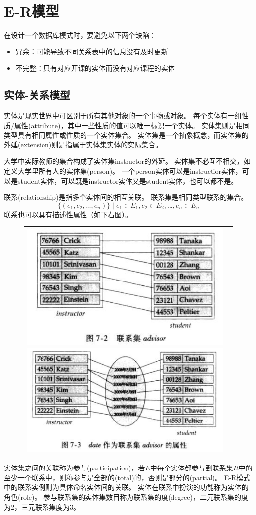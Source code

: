 
\section{E-R模型} %
在设计一个数据库模式时，要避免以下两个缺陷：
\begin{itemize}
	\item 冗余：可能导致不同关系表中的信息没有及时更新
	\item 不完整：只有对应开课的实体而没有对应课程的实体
\end{itemize}

\subsection{实体-关系模型}
\begin{definition}[实体]
实体是现实世界中可区别于所有其他对象的一个事物或对象。
每个实体有一组性质/属性(attribute)，其中一些性质的值可以唯一标识一个实体。
实体集则是相同类型具有相同属性或性质的一个实体集合。
实体集是一个抽象概念，而实体集的外延(extension)则是指属于实体集实体的实际集合。
\end{definition}

大学中实际教师的集合构成了实体集instructor的外延。
实体集不必互不相交，如定义大学里所有人的实体集(person)。
一个person实体可以是instructior实体，可以是student实体，可以既是instructor实体又是student实体，也可以都不是。

\begin{definition}[联系]
联系(relationship)是指多个实体间的相互关联。
联系集是相同类型联系的集合。
\[\{(e_1,e_2,\ldots,e_n)\}\mid e_1\in E_1, e_2\in E_2, \ldots, e_n\in E_n\]
联系也可以具有描述性属性（如下右图）。
\begin{figure}[H]
\centering
\begin{tabular}{cc}
\includegraphics[width=0.5\linewidth]{fig/relationship_set.png}
\includegraphics[width=0.5\linewidth]{fig/relationship_set(description).png}
\end{tabular}
\end{figure}
实体集之间的关联称为参与(participation)，若$E$中每个实体都参与到联系集$R$中的至少一个联系中，则称参与是全部的(total)的，否则是部分的(partial)。
E-R模式中的联系实例则为具体命名实体间的关联。
实体在联系中扮演的功能称为实体的角色(role)。
参与联系集的实体集数目称为联系集的度(degree)，二元联系集的度为2，三元联系集度为3。
\end{definition}

